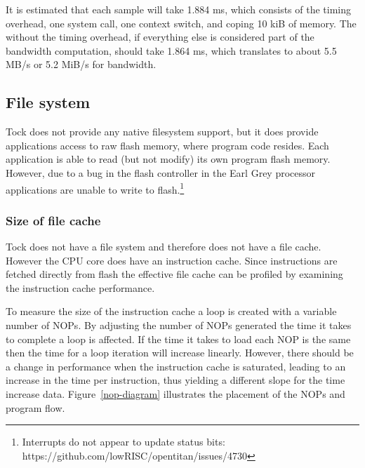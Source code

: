 \documentclass{article}
\begin{document}
It is estimated that each sample will take 1.884 ms, which consists of the timing overhead, one system call, one context switch, and coping 10 kiB of memory. The without the timing overhead, if everything else is considered part of the bandwidth computation, should take 1.864 ms, which translates to about 5.5 MB/s or 5.2 MiB/s for bandwidth.

\subsection{File system}

Tock does not provide any native filesystem support, but it does provide applications access to raw flash memory, where program code resides. Each application is able to read (but not modify) its own program flash memory. However, due to a bug in the flash controller in the Earl Grey processor applications are unable to write to flash.\footnote{Interrupts do not appear to update status bits: https://github.com/lowRISC/opentitan/issues/4730}

\subsubsection{Size of file cache}
Tock does not have a file system and therefore does not have a file cache. However the CPU core does have an instruction cache. Since instructions are fetched directly from flash the effective file cache can be profiled by examining the instruction cache performance.

To measure the size of the instruction cache a loop is created with a variable number of NOPs. By adjusting the number of NOPs generated the time it takes to complete a loop is affected. If the time it takes to load each NOP is the same then the time for a loop iteration will increase linearly. However, there should be a change in performance when the instruction cache is saturated, leading to an increase in the time per instruction, thus yielding a different slope for the time increase data. Figure~\ref{nop-diagram} illustrates the placement of the NOPs and program flow.
\end{document}
